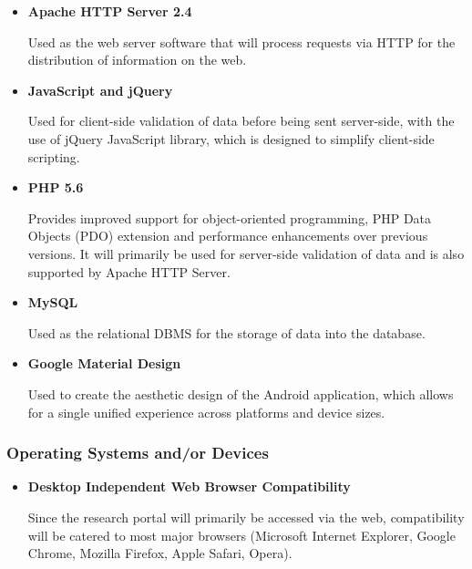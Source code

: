 \documentclass[hidelinks,a4paper,12pt]{article}
\begin{document}
\begin{flushleft}
\begin{itemize}
	\item 	\textbf{Apache HTTP Server 2.4}	
	
	Used as the web server software that will process requests via HTTP for the distribution of information on the web.
\end{itemize}
	
\begin{itemize}
	\item 	\textbf{JavaScript and jQuery}	
	
	Used for client-side validation of data before being sent server-side, with the use of jQuery JavaScript library, which is designed to simplify client-side scripting.
\end{itemize}
	
\begin{itemize}
	\item 	\textbf{PHP 5.6}
		
	Provides improved support for object-oriented programming, PHP Data Objects (PDO) extension and performance enhancements over previous versions. 
	It will primarily be used for server-side validation of data and is also supported by Apache HTTP Server.
\end{itemize}
	
\begin{itemize}
	\item 	\textbf{MySQL}
		
	Used as the relational DBMS for the storage of data into the database. 
\end{itemize}
	
	\begin{itemize}
		\item \textbf{Google Material Design}	
		
	Used to create the aesthetic design of the Android application, which allows for a single unified experience across platforms and device sizes.
	\end{itemize}
	
	\subsubsection{Operating Systems and/or Devices}
	
	\begin{itemize}
		\item \textbf{Desktop Independent Web Browser Compatibility}
	
	Since the research portal will primarily be accessed via the web, compatibility will be catered to most major browsers (Microsoft Internet Explorer, Google Chrome, Mozilla Firefox, Apple Safari, Opera). 
	

\end{itemize}
\end{flushleft}
\end{document}
